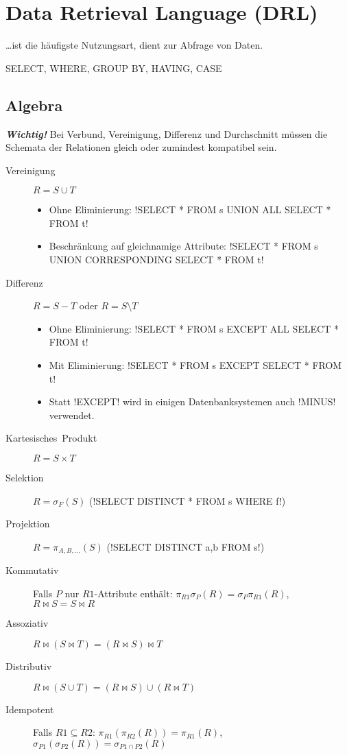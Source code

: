 %

\section{Data Retrieval Language\foreignlanguage{ngerman}{ (DRL)}}

%
\ldots{}ist
die häufigste Nutzungsart, dient zur Abfrage von Daten.

SELECT, WHERE, GROUP BY, HAVING, CASE


\subsection{Algebra}

\textbf{\emph{Wichtig!}} Bei Verbund, Vereinigung, Differenz und Durchschnitt müssen die Schemata der Relationen gleich oder zumindest kompatibel sein.
\begin{description}
  \item [{Vereinigung}] $R=S\cup T$
  \begin{itemize}
    \item Ohne Eliminierung: \sqli!SELECT * FROM s UNION ALL SELECT * FROM t!
    \item Beschränkung auf gleichnamige Attribute: \sqli!SELECT * FROM s UNION CORRESPONDING SELECT * FROM t!
  \end{itemize}
  \item [{Differenz}] $R=S-T$ oder $R=S\setminus T$
  \begin{itemize}
    \item Ohne Eliminierung: \sqli!SELECT * FROM s EXCEPT ALL SELECT * FROM t!
    \item Mit Eliminierung: \sqli!SELECT * FROM s EXCEPT SELECT * FROM t!
    \item Statt \sqli!EXCEPT! wird in einigen Datenbanksystemen auch \sqli!MINUS! verwendet.
  \end{itemize}
  \item [{Kartesisches~Produkt}] $R=S\times T$
  \item [{Selektion}] $R=\sigma_{F}(S)$ (\sqli!SELECT DISTINCT * FROM s WHERE f!)
  \item [{Projektion}] $R=\pi_{A,B,\ldots}(S)$ (\sqli!SELECT DISTINCT a,b FROM s!)
  \item [{Kommutativ}] Falls $P$ nur $R1$-Attribute enthält: $\pi_{R1}\sigma_{P}(R)=\sigma_{P}\pi_{R1}(R)$, $R\bowtie S=S\bowtie R$
  \item [{Assoziativ}] $R\bowtie(S\bowtie T)=(R\bowtie S)\bowtie T$
  \item [{Distributiv}] $R\bowtie(S\cup T)=(R\bowtie S)\cup(R\bowtie T)$
  \item [{Idempotent}] Falls $R1\subseteq R2$: $\pi_{R1}(\pi_{R2}(R))=\pi_{R1}(R)$, $\sigma_{P1}(\sigma_{P2}(R))=\sigma_{P1\cap P2}(R)$
\end{description}

